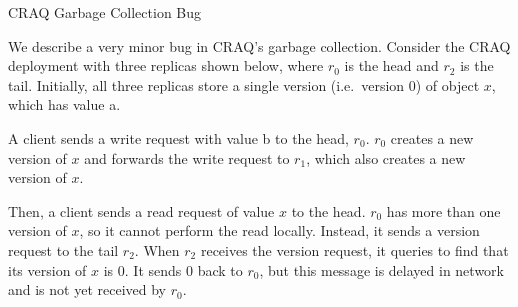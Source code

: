 \documentclass[12pt]{article}
\newcommand{\drawchain}{
  \node[replica] (r0) at (0, 0) {$r_0$};
  \node[replica] (r1) at (1, 0) {$r_1$};
  \node[replica] (r2) at (2, 0) {$r_2$};
}
\newcommand{\oneversion}[3]{
  \begin{tabular}{|l|l|l|}
    \hline
    $#1$ & $#2$ & #3 \\\hline
  \end{tabular}
}
\newcommand{\twoversions}[6]{
  \begin{tabular}{|l|l|l|}
    \hline
    $#1$ & $#2$ & #3 \\\hline
    $#4$ & $#5$ & #6 \\\hline
  \end{tabular}
}
\begin{document}
\begin{center}
  \Large CRAQ Garbage Collection Bug
\end{center}

We describe a very minor bug in CRAQ's garbage collection. Consider the CRAQ
deployment with three replicas shown below, where $r_0$ is the head and $r_2$
is the tail. Initially, all three replicas store a single version (i.e.\
version $0$) of object $x$, which has value a.
\begin{center}
\end{center}

A client sends a write request with value b to the head, $r_0$. $r_0$ creates a
new version of $x$ and forwards the write request to $r_1$, which also creates
a new version of $x$.
\begin{center}
\end{center}

Then, a client sends a read request of value $x$ to the head. $r_0$ has more
than one version of $x$, so it cannot perform the read locally. Instead, it
sends a version request to the tail $r_2$. When $r_2$ receives the version
request, it queries to find that its version of $x$ is $0$. It sends $0$ back
to $r_0$, but this message is delayed in network and is not yet received by
$r_0$.
\begin{center}
\end{center}
\end{document}
